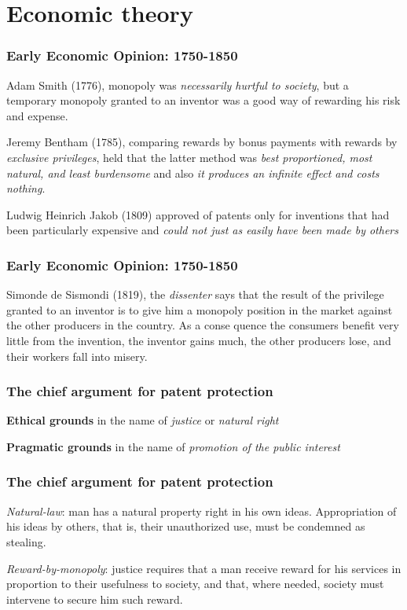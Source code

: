 
\setlength{\parskip}{\baselineskip} 
\section{Economic theory}
\begin{frame}[t]
\frametitle{Early Economic Opinion: 1750-1850}
Adam Smith (1776), monopoly was \textit{necessarily hurtful to society}, but a temporary monopoly granted to an inventor was a good way of rewarding his risk and expense.

Jeremy Bentham (1785), comparing rewards by bonus payments with rewards by \textit{exclusive privileges}, held that the latter method was \textit{best proportioned, most natural, and least burdensome} and also \textit{it produces an infinite effect and costs nothing}.

Ludwig Heinrich Jakob (1809) approved of patents only for inventions that had been particularly expensive and \textit{could not just as easily have been made by others}
\end{frame}


\begin{frame}
\frametitle{Early Economic Opinion: 1750-1850}
Simonde de Sismondi (1819), the \textit{dissenter} says that
the result of the privilege granted to an inventor is to give him a monopoly position in the market against the other producers in the country. As a conse quence the consumers benefit very little from the invention, the inventor gains much, the other producers lose, and their workers fall into misery.
\end{frame}

\begin{frame}
\frametitle{The chief argument for patent protection}
\textbf{Ethical grounds} in the name of \textit{justice} or \textit{natural right}

\textbf{Pragmatic grounds} in the name of \textit{promotion of the public interest}
\end{frame}

\begin{frame}
\frametitle{The chief argument for patent protection}
\textit{Natural-law}: man has a natural property right in his own ideas. Appropriation of his ideas by others, that is, their unauthorized use, must be condemned as stealing.

\textit{Reward-by-monopoly}: justice requires that a man receive reward for his services in proportion to their usefulness to society, and that, where needed, society must intervene to secure him such reward.
\end{frame}

